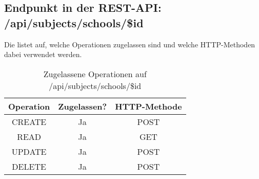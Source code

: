 \subsection{Endpunkt in der REST-API: /api/subjects/schools/\$id}
Die  listet auf, welche Operationen zugelassen sind und welche HTTP-Methoden dabei verwendet werden. 

\begin{table}[!htbp]
	\begin{tabular}{|c|c|c|}
		\hline
			\textbf{Operation} & \textbf{Zugelassen?} & \textbf{HTTP-Methode} \\ \hline
			CREATE & Ja & POST \\ \hline 
			READ & Ja & GET \\ \hline
			UPDATE & Ja & POST \\ \hline 
			DELETE & Ja & POST \\ \hline
	\end{tabular}

		\caption{Zugelassene Operationen auf /api/subjects/schools/\$id}
		\label{tab:end:rest:api:subjects:schools:id:meth}
\end{table}

